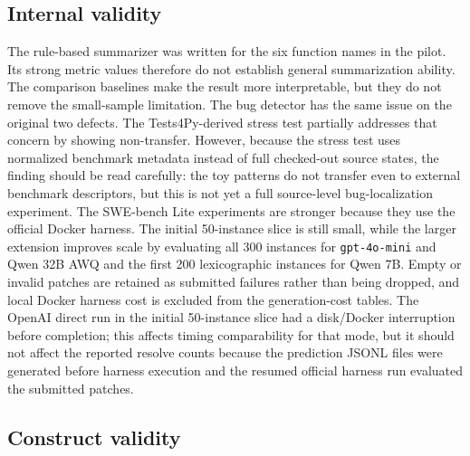 \documentclass[preprint,12pt]{elsarticle}
\begin{document}
\subsection{Internal validity}

The rule-based summarizer was written for the six function names in the pilot. Its strong metric values therefore do not establish general summarization ability. The comparison baselines make the result more interpretable, but they do not remove the small-sample limitation. The bug detector has the same issue on the original two defects. The Tests4Py-derived stress test partially addresses that concern by showing non-transfer. However, because the stress test uses normalized benchmark metadata instead of full checked-out source states, the finding should be read carefully: the toy patterns do not transfer even to external benchmark descriptors, but this is not yet a full source-level bug-localization experiment. The SWE-bench Lite experiments are stronger because they use the official Docker harness. The initial 50-instance slice is still small, while the larger extension improves scale by evaluating all 300 instances for \texttt{gpt-4o-mini} and Qwen 32B AWQ and the first 200 lexicographic instances for Qwen 7B. Empty or invalid patches are retained as submitted failures rather than being dropped, and local Docker harness cost is excluded from the generation-cost tables. The OpenAI direct run in the initial 50-instance slice had a disk/Docker interruption before completion; this affects timing comparability for that mode, but it should not affect the reported resolve counts because the prediction JSONL files were generated before harness execution and the resumed official harness run evaluated the submitted patches.

\subsection{Construct validity}
\end{document}
